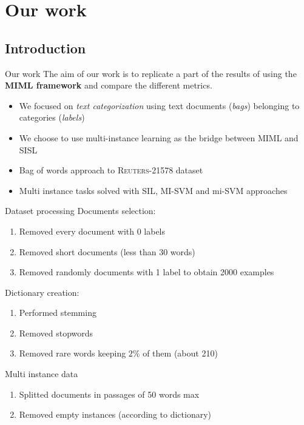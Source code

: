 \section{Our work}

\subsection*{Introduction}
\begin{frame}{Our work}
	The aim of our work is to replicate a part of the results of \cite{miml1} using the \textbf{MIML framework} and compare the different metrics.\\
	\vspace{12px}
	\begin{itemize}
		\item We focused on \textit{text categorization} using text documents (\textit{bags}) belonging to categories (\textit{labels})
		\item We choose to use multi-instance learning as the bridge between MIML and SISL
		\item Bag of words approach to \textsc{Reuters-21578} dataset
		\item Multi instance tasks solved with SIL, MI-SVM and mi-SVM approaches
	\end{itemize}
\end{frame}

\begin{frame}{Dataset processing}
	Documents selection:
	\begin{enumerate}
		\item Removed every document with 0 labels
		\item Removed short documents (less than 30 words)
		\item Removed randomly documents with 1 label to obtain 2000 examples
	\end{enumerate}
	Dictionary creation:
	\begin{enumerate}
		\item Performed stemming
		\item Removed stopwords
		\item Removed rare words keeping $2\%$ of them (about 210)
	\end{enumerate}
	Multi instance data
	\begin{enumerate}
		\item Splitted documents in passages of 50 words max
		\item Removed empty instances (according to dictionary)
	\end{enumerate}
\end{frame}

